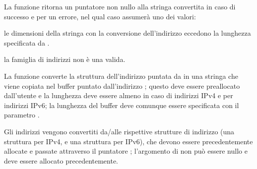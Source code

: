 \begin{funcproto}{
}

{La funzione ritorna un puntatore non nullo alla stringa convertita in caso di
  successo e  per un errore, nel qual caso  assumerà uno
  dei valori:
  \begin{errlist}
    \item[\errcode{ENOSPC}] le dimensioni della stringa con la conversione
      dell'indirizzo eccedono la lunghezza specificata da .
    \item[\errcode{ENOAFSUPPORT}] la famiglia di indirizzi  non è
      una valida.
  \end{errlist}
}
\end{funcproto}


La funzione converte la struttura dell'indirizzo puntata da 
in una stringa che viene copiata nel buffer puntato dall'indirizzo
; questo deve essere preallocato dall'utente e la lunghezza deve
essere almeno  in caso di indirizzi IPv4 e
 per indirizzi IPv6; la lunghezza del buffer deve
comunque essere specificata con il parametro .

Gli indirizzi vengono convertiti da/alle rispettive strutture di indirizzo
(una struttura  per IPv4, e una struttura 
per IPv6), che devono essere precedentemente allocate e passate attraverso il
puntatore ; l'argomento  di  non
può essere nullo e deve essere allocato precedentemente.





